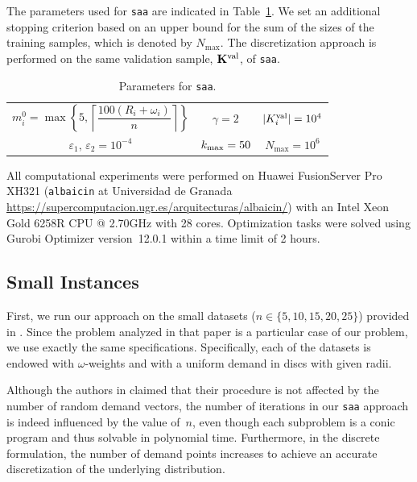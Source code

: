\documentclass[letter,11pt, reqno]{amsart}
\renewcommand{\;}{\quad}
\theoremstyle{thmstyleone}%
\theoremstyle{thmstyletwo}%
\theoremstyle{thmstylethree}%
\begin{document}
The parameters used for \texttt{saa} are indicated in Table~\ref{tab:params}. We set an additional stopping criterion based on an upper bound for the sum of the sizes of the training samples, 
which is denoted by $N_{\max}$. The discretization approach is performed on the same validation sample, $\mathbf{K}^{\rm val}$, of \texttt{saa}.
\begin{table}[h!]
\centering
\renewcommand{\arraystretch}{1}
\begin{tabular}{|c  c  c|}\hline
$m_i^0 = \max\!\left\{5, \left\lceil \dfrac{100 (R_i+\omega_i)}{n} \right\rceil \right\}$ 
& $\gamma = 2$ 
& $|K^{\rm val}_{i}| = 10^4$  \\
 $\varepsilon_1,\, \varepsilon_2 = 10^{-4}$
& $k_{\rm max}=50$
& $N_{\max} = 10^6$\\\hline
\end{tabular}
\caption{Parameters for \texttt{saa}.}
\label{tab:params}
\end{table}
All computational experiments were performed on Huawei FusionServer Pro XH321 (\texttt{albaicin} at Universidad de Granada \url{https://supercomputacion.ugr.es/arquitecturas/albaicin/}) with an Intel Xeon Gold 6258R CPU @ 2.70GHz with 28 cores. Optimization tasks were solved using Gurobi Optimizer version~12.0.1 within a time limit of 2 hours.
\subsection*{Small Instances}
First, we run our approach on the small datasets ($n\in \{5,10,15,20,25\}$) provided in \cite{kalczynski2025weber}. Since the problem analyzed in that paper is a particular case of our problem, we use exactly the same specifications. Specifically, each of the datasets is endowed with $\omega$-weights and with a uniform demand in discs with given radii.

Although the authors in \citet{kalczynski2025weber} claimed that their procedure is not affected by the number of random demand vectors, the number of iterations in our \texttt{saa} approach is indeed influenced by the value of~$n$, even though each subproblem is a conic program and thus solvable in polynomial time. Furthermore, in the discrete formulation, the number of demand points increases to achieve an accurate discretization of the underlying distribution.
\end{document}
